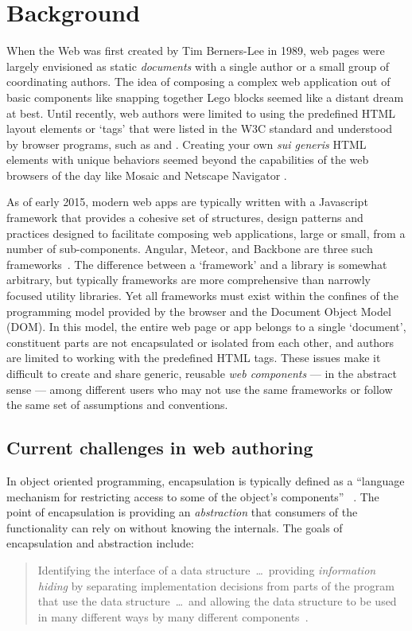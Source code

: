 \chapter{Background}
%
\label{ch:background}

When the Web was first created by Tim Berners-Lee in 1989, web pages were largely envisioned as static \textit{documents} with a single author or a small group of coordinating authors. 
The idea of composing a complex web application out of basic components like snapping together Lego blocks seemed like a distant dream at best.
Until recently, web authors were limited to using the predefined HTML layout elements or `tags' that were listed in the W3C standard and understood by browser programs, such as  and . 
Creating your own \textit{sui generis} HTML elements with unique behaviors seemed beyond the capabilities of the web browsers of the day like Mosaic
and Netscape Navigator .

As of early 2015, modern web apps are typically written with a Javascript framework that provides a cohesive set of structures, design patterns and practices designed to facilitate composing web applications, large or small, from a number of sub-components.
Angular, Meteor, and Backbone are three such frameworks~\cite{dickey2014}.
The difference between a `framework' and a library is somewhat arbitrary, but typically frameworks are more comprehensive than narrowly focused utility libraries.
Yet all frameworks must exist within the confines of the programming model provided by the browser and the Document Object Model (DOM). 
In this model, the entire web page or app belongs to a single `document', constituent parts are not encapsulated or isolated from each other, and authors are limited to working with the predefined HTML tags.
These issues make it difficult to create and share generic, reusable \textit{web components} 
--- in the abstract sense --- 
among different users who may not use the same frameworks or follow the same set of assumptions and conventions.

\section{Current challenges in web authoring}
In object oriented programming, encapsulation is typically defined as a 
``language mechanism for restricting access to some of the object's components''
~\cite[p. 522]{mitchell2003}.
The point of encapsulation is providing an \textit{abstraction} that consumers of the functionality can rely on without knowing the internals. 
The goals of encapsulation and abstraction include:
\begin{quote}
Identifying the interface of a data structure~\dots~providing \textit{information hiding} by separating implementation decisions from parts of the program that use the data 
structure~\dots~and allowing the data structure to be used in many different ways by many different components~\cite[p. 243]{mitchell2003}.
\end{quote}

